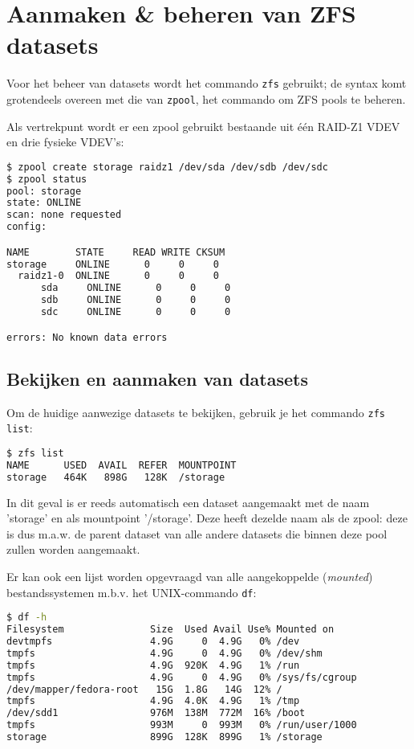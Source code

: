 \section{Aanmaken \& beheren van ZFS datasets}

Voor het beheer van datasets wordt het commando \texttt{zfs} gebruikt; de syntax komt grotendeels overeen met die van \texttt{zpool}, het commando om ZFS pools te beheren. 

Als vertrekpunt wordt er een zpool gebruikt bestaande uit één RAID-Z1 VDEV en drie fysieke VDEV's:

\begin{lstlisting}[language=bash,style=command_style]
$ zpool create storage raidz1 /dev/sda /dev/sdb /dev/sdc
$ zpool status
pool: storage
state: ONLINE
scan: none requested
config:

NAME        STATE     READ WRITE CKSUM
storage     ONLINE      0     0     0
  raidz1-0  ONLINE      0     0     0
	  sda     ONLINE      0     0     0
	  sdb     ONLINE      0     0     0
	  sdc     ONLINE      0     0     0

errors: No known data errors
\end{lstlisting}

\subsection{Bekijken en aanmaken van datasets}

Om de huidige aanwezige datasets te bekijken, gebruik je het commando \texttt{zfs list}:

\begin{lstlisting}[language=bash,style=command_style] 
$ zfs list
NAME      USED  AVAIL  REFER  MOUNTPOINT
storage   464K   898G   128K  /storage
\end{lstlisting}

In dit geval is er reeds automatisch een dataset aangemaakt met de naam 'storage' en als mountpoint '/storage'. Deze heeft dezelde naam als de zpool: deze is dus m.a.w. de parent dataset van alle andere datasets die binnen deze pool zullen worden aangemaakt.

Er kan ook een lijst worden opgevraagd van alle aangekoppelde (\textit{mounted}) bestandssystemen m.b.v. het UNIX-commando \texttt{df}:

\begin{lstlisting}[language=bash,style=command_style] 
$ df -h
Filesystem               Size  Used Avail Use% Mounted on
devtmpfs                 4.9G     0  4.9G   0% /dev
tmpfs                    4.9G     0  4.9G   0% /dev/shm
tmpfs                    4.9G  920K  4.9G   1% /run
tmpfs                    4.9G     0  4.9G   0% /sys/fs/cgroup
/dev/mapper/fedora-root   15G  1.8G   14G  12% /
tmpfs                    4.9G  4.0K  4.9G   1% /tmp
/dev/sdd1                976M  138M  772M  16% /boot
tmpfs                    993M     0  993M   0% /run/user/1000
storage                  899G  128K  899G   1% /storage 
\end{lstlisting}

